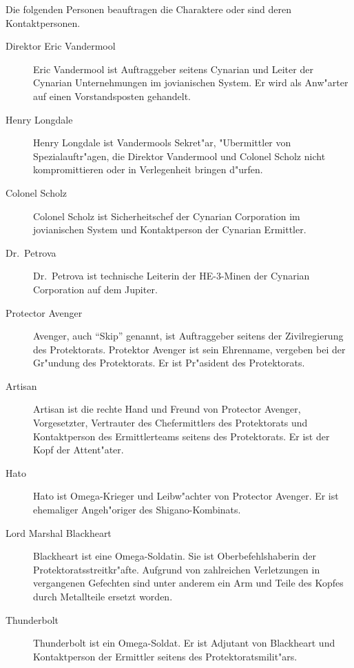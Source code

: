 
Die folgenden Personen beauftragen die Charaktere oder sind deren Kontaktpersonen.


\begin{description}
    \item [Direktor Eric Vandermool] Eric Vandermool ist Auftraggeber seitens Cynarian und Leiter der Cynarian Unternehmungen im 
        jovianischen System. Er wird als Anw"arter auf einen Vorstandsposten gehandelt.
    \item [Henry Longdale] Henry  Longdale ist Vandermools Sekret"ar, "Ubermittler von Spezialauftr"agen, die Direktor Vandermool und 
        Colonel Scholz nicht kompromittieren oder in Verlegenheit bringen d"urfen.
    \item [Colonel Scholz] Colonel Scholz ist Sicherheitschef der Cynarian Corporation im jovianischen System und Kontaktperson der 
        Cynarian Ermittler.
    \item [Dr.~Petrova] Dr.~Petrova ist technische Leiterin der HE-3-Minen der Cynarian Corporation auf dem Jupiter.
\end{description}


\begin{description}
    \item [Protector Avenger] Avenger, auch ``Skip'' genannt, ist Auftraggeber seitens der Zivilregierung des Protektorats. Protektor 
        Avenger ist sein Ehrenname, vergeben bei der Gr"undung des Protektorats. Er ist Pr"asident des Protektorats.
    \item [Artisan] Artisan ist die rechte Hand und Freund von Protector Avenger, Vorgesetzter, Vertrauter des Chefermittlers des 
        Protektorats und Kontaktperson des Ermittlerteams seitens des Protektorats. Er ist der Kopf der Attent"ater. 
    \item [Hato] Hato ist Omega-Krieger und Leibw"achter von Protector Avenger. Er ist ehemaliger Angeh"origer des Shigano-Kombinats.
    \item [Lord Marshal Blackheart] Blackheart ist eine Omega-Soldatin. Sie ist Oberbefehlshaberin der Protektoratsstreitkr"afte. Aufgrund  
        von zahlreichen Verletzungen in vergangenen Gefechten sind unter anderem ein Arm und Teile des Kopfes durch Metallteile ersetzt worden.
    \item [Thunderbolt] Thunderbolt ist ein Omega-Soldat. Er ist Adjutant von Blackheart und Kontaktperson der Ermittler seitens des 
        Protektoratsmilit"ars.
\end{description}
